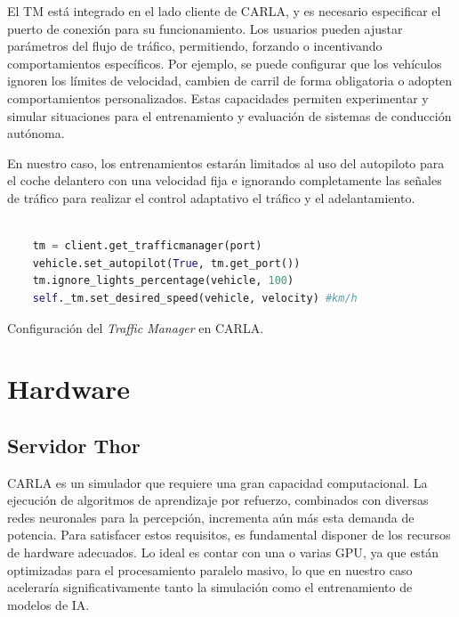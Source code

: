 El \ac{TM} está integrado en el lado cliente de CARLA, y es necesario especificar el puerto de conexión para su funcionamiento. Los usuarios pueden ajustar parámetros del flujo de tráfico, permitiendo, forzando o incentivando comportamientos específicos. Por ejemplo, se puede configurar que los vehículos ignoren los límites de velocidad, cambien de carril de forma obligatoria o adopten comportamientos personalizados. Estas capacidades permiten experimentar y simular situaciones para el entrenamiento y evaluación de sistemas de conducción autónoma.

En nuestro caso, los entrenamientos estarán limitados al uso del autopiloto para el coche delantero con una velocidad fija e ignorando completamente las señales de tráfico para realizar el control adaptativo el tráfico y el adelantamiento. 

\begin{code}[h]
	\begin{lstlisting}[language=python]
	
	tm = client.get_trafficmanager(port)
	vehicle.set_autopilot(True, tm.get_port())  
	tm.ignore_lights_percentage(vehicle, 100) 
	self._tm.set_desired_speed(vehicle, velocity) #km/h
\end{lstlisting}
\caption[Configuración del \textit{Traffic Manager} en CARLA]{Configuración del \textit{Traffic Manager} en CARLA.}
\label{cod:tm_carla}
\end{code}

\section{Hardware}
\label{sec:hw}
\subsection{Servidor Thor}
\label{sec:thor}

CARLA es un simulador que requiere una gran capacidad computacional. La ejecución de algoritmos de aprendizaje por refuerzo, combinados con diversas redes neuronales para la percepción, incrementa aún más esta demanda de potencia. Para satisfacer estos requisitos, es fundamental disponer de los recursos de hardware adecuados. Lo ideal es contar con una o varias \ac{GPU}, ya que están optimizadas para el procesamiento paralelo masivo, lo que en nuestro caso aceleraría significativamente tanto la simulación como el entrenamiento de modelos de \ac{IA}. 

